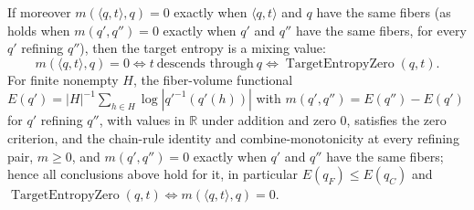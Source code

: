 \begin{theorem}
If moreover \(m(\langle q,t\rangle,q)=0\) exactly when \(\langle q,t\rangle\)
and \(q\) have the same fibers (as holds when \(m(q',q'')=0\) exactly when
\(q'\) and \(q''\) have the same fibers, for every \(q'\) refining \(q''\)), then
the target entropy is a mixing value:
\[
  m(\langle q,t\rangle,q)=0
  \iff t\ \text{descends through}\ q
  \iff \operatorname{TargetEntropyZero}(q,t).
\]
For finite nonempty \(H\), the fiber-volume functional
\(E(q')=|H|^{-1}\sum_{h\in H}\log|q'^{-1}(q'(h))|\) with
\(m(q',q'')=E(q'')-E(q')\) for \(q'\) refining \(q''\), with values in
\(\mathbb R\) under addition and zero \(0\), satisfies the zero criterion, and the chain-rule identity and
combine-monotonicity at every refining pair,
\(m\ge0\), and \(m(q',q'')=0\) exactly when \(q'\) and \(q''\) have the same
fibers; hence all conclusions above hold for it, in particular
\(E(q_F)\le E(q_C)\) and
\(\operatorname{TargetEntropyZero}(q,t)\iff m(\langle q,t\rangle,q)=0\).
\end{theorem}

